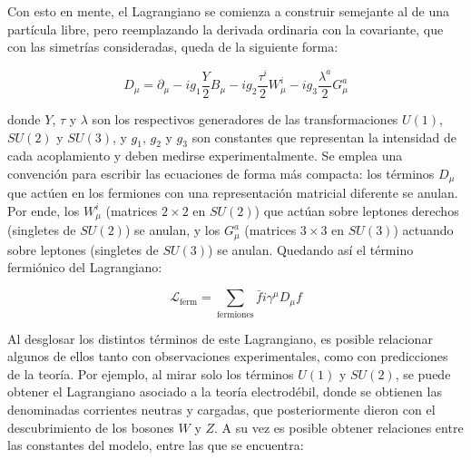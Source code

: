 Con esto en mente, el Lagrangiano se comienza a construir semejante al de una partícula libre, pero reemplazando la derivada ordinaria con la covariante, que con las simetrías consideradas, queda de la siguiente forma:


\begin{equation}
D_{\mu} = \partial_{\mu} - i g_{1} \frac{Y}{2}B_{\mu} - i g_{2} \frac{\tau^{i}}{2}W_{\mu}^{i} - i g_{3} \frac{\lambda^{a}}{2}G_{\mu}^{a}
\label{eq:cov_deriv}
\end{equation}

\noindent
donde $Y$, $\tau$ y $\lambda$ son los respectivos generadores de las transformaciones $U(1)$, $SU(2)$ y $SU(3)$, y $g_1$, $g_2$ y $g_3$ son constantes que representan la intensidad de cada acoplamiento y deben medirse experimentalmente. Se emplea una convención para escribir las ecuaciones de forma más compacta: los términos $D_{\mu}$ que actúen en los fermiones con una representación matricial diferente se anulan. Por ende, los $W_{\mu}^{i}$ (matrices $2\times2$ en $SU(2)$) que actúan sobre leptones derechos (singletes de $SU(2)$) se anulan, y los $G_{\mu}^{a}$ (matrices $3\times3$ en $SU(3)$) actuando sobre leptones (singletes de $SU(3)$) se anulan. Quedando así el término fermiónico del Lagrangiano:

\begin{equation}
\mathcal{L}_{\text{ferm}} = \sum_{\text{fermiones}} \bar{f}i\gamma^{\mu}D_{\mu}f
\end{equation}

Al desglosar los distintos términos de este Lagrangiano, es posible relacionar algunos de ellos tanto con observaciones experimentales, como con predicciones de la teoría. Por ejemplo, al mirar solo los términos $U(1)$ y $SU(2)$, se puede obtener el Lagrangiano asociado a la teoría electrodébil, donde se obtienen las denominadas corrientes neutras y cargadas, que posteriormente dieron con el descubrimiento de los bosones $W$ y $Z$. A su vez es posible obtener relaciones entre las constantes del modelo, entre las que se encuentra:



